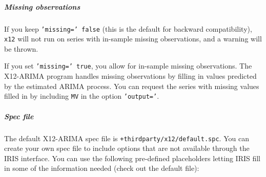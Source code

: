  \subparagraph{Missing observations}
 
 If you keep \texttt{'missing=' false} (this is the default for backward
 compatibility), \texttt{x12} will not run on series with in-sample
 missing observations, and a warning will be thrown.
 
 If you set \texttt{'missing=' true}, you allow for in-sample missing
 observations. The X12-ARIMA program handles missing observations by
 filling in values predicted by the estimated ARIMA process. You can
 request the series with missing values filled in by including
 \texttt{MV} in the option \texttt{'output='}.
 
 \subparagraph{Spec file}
 
 The default X12-ARIMA spec file is \texttt{+thirdparty/x12/default.spc}.
 You can create your own spec file to include options that are not
 available through the IRIS interface. You can use the following
 pre-defined placeholders letting IRIS fill in some of the information
 needed (check out the default file):
 
